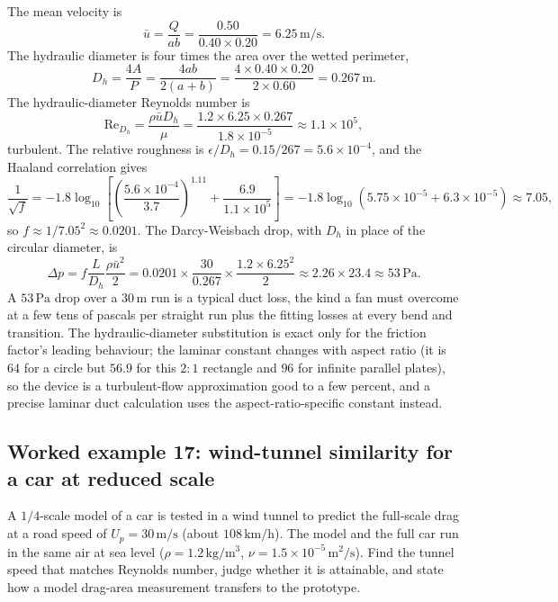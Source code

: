 The mean velocity is
\[
\bar u = \frac{Q}{ab} = \frac{0.50}{0.40\times0.20} = 6.25\,\si{
\meter\per\second}.
\]
The hydraulic diameter is four times the area over the wetted
perimeter,
\[
D_h = \frac{4A}{P} = \frac{4ab}{2(a+b)} = \frac{4\times0.40\times
0.20}{2\times0.60} = 0.267\,\si{\meter}.
\]
The hydraulic-diameter Reynolds number is
\[
\text{Re}_{D_h} = \frac{\rho\bar u D_h}{\mu} = \frac{1.2\times6.25
\times0.267}{1.8\times10^{-5}} \approx 1.1\times10^{5},
\]
turbulent. The relative roughness is $\epsilon/D_h = 0.15/267 =
5.6\times10^{-4}$, and the Haaland correlation gives
\[
\frac{1}{\sqrt f} = -1.8\log_{10}\!\left[\left(\frac{5.6\times
10^{-4}}{3.7}\right)^{1.11} + \frac{6.9}{1.1\times10^{5}}\right]
= -1.8\log_{10}(5.75\times10^{-5} + 6.3\times10^{-5}) \approx 7.05,
\]
so $f \approx 1/7.05^2 \approx 0.0201$. The Darcy-Weisbach drop,
with $D_h$ in place of the circular diameter, is
\[
\Delta p = f\frac{L}{D_h}\frac{\rho\bar u^2}{2} = 0.0201\times
\frac{30}{0.267}\times\frac{1.2\times6.25^2}{2} \approx 2.26\times
23.4 \approx 53\,\si{\pascal}.
\]
A $53\,\si{\pascal}$ drop over a $30\,\si{\meter}$ run is a typical
duct loss, the kind a fan must overcome at a few tens of pascals per
straight run plus the fitting losses at every bend and transition.
The hydraulic-diameter substitution is exact only for the friction
factor's leading behaviour; the laminar constant changes with
aspect ratio (it is $64$ for a circle but $56.9$ for this $2{:}1$
rectangle and $96$ for infinite parallel plates), so the device is
a turbulent-flow approximation good to a few percent, and a precise
laminar duct calculation uses the aspect-ratio-specific constant
instead.





\subsection*{Worked example 17: wind-tunnel similarity for a car at reduced scale}

A $1/4$-scale model of a car is tested in a wind tunnel to predict the
full-scale drag at a road speed of $U_p = 30\,\si{\meter\per\second}$
(about $108\,\text{km/h}$). The model and the full car run in the same
air at sea level ($\rho = 1.2\,\si{\kilogram\per\meter\cubed}$, $\nu =
1.5\times10^{-5}\,\si{\meter}^2/\si{\second}$). Find the tunnel speed
that matches Reynolds number, judge whether it is attainable, and state
how a model drag-area measurement transfers to the prototype.


